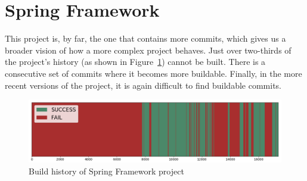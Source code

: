 \section{Spring Framework}

This project is, by far, the one that contains more commits, which gives us a broader vision of how a more complex project behaves.
Just over two-thirds of the project's history (as shown in Figure~\ref{fig:springHist}) cannot be built.
There is a consecutive set of commits where it becomes more buildable.
Finally, in the more recent versions of the project, it is again difficult to find buildable commits.

\begin{figure}[h]
	\begin{center}
		\includegraphics[width=\linewidth]{charts/spring-frameworkHist}
		\caption{Build history of Spring Framework project}
		\label{fig:springHist}
	\end{center}
\end{figure}

